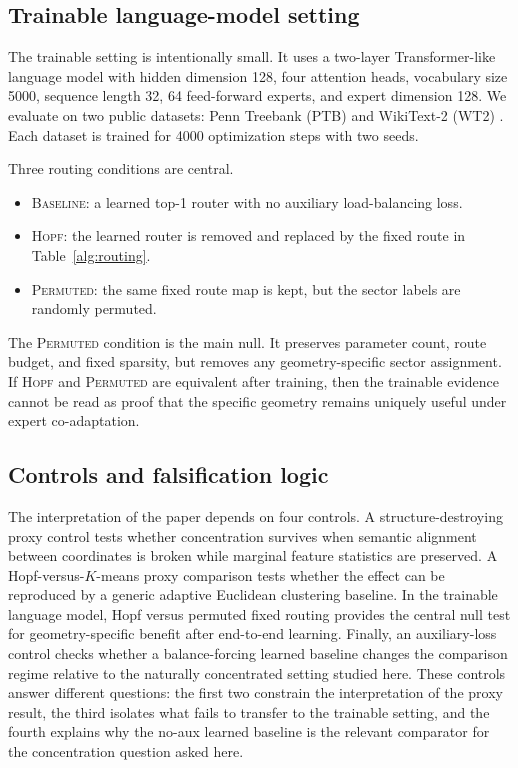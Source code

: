 \documentclass[10pt,letterpaper]{article}
\begin{document}
\subsection{Trainable language-model setting}
The trainable setting is intentionally small. It uses a two-layer Transformer-like language model with hidden dimension 128, four attention heads, vocabulary size 5000, sequence length 32, 64 feed-forward experts, and expert dimension 128. We evaluate on two public datasets: Penn Treebank (PTB) \citep{ptb1993} and WikiText-2 (WT2) \citep{merity2016wt2}. Each dataset is trained for 4000 optimization steps with two seeds.

Three routing conditions are central.
\begin{itemize}
\item \textsc{Baseline}: a learned top-1 router with no auxiliary load-balancing loss.
\item \textsc{Hopf}: the learned router is removed and replaced by the fixed route in Table~\ref{alg:routing}.
\item \textsc{Permuted}: the same fixed route map is kept, but the sector labels are randomly permuted.
\end{itemize}

The \textsc{Permuted} condition is the main null. It preserves parameter count, route budget, and fixed sparsity, but removes any geometry-specific sector assignment. If \textsc{Hopf} and \textsc{Permuted} are equivalent after training, then the trainable evidence cannot be read as proof that the specific geometry remains uniquely useful under expert co-adaptation.

\subsection{Controls and falsification logic}
The interpretation of the paper depends on four controls. A structure-destroying proxy control tests whether concentration survives when semantic alignment between coordinates is broken while marginal feature statistics are preserved. A Hopf-versus-\(K\)-means proxy comparison tests whether the effect can be reproduced by a generic adaptive Euclidean clustering baseline. In the trainable language model, Hopf versus permuted fixed routing provides the central null test for geometry-specific benefit after end-to-end learning. Finally, an auxiliary-loss control checks whether a balance-forcing learned baseline changes the comparison regime relative to the naturally concentrated setting studied here. These controls answer different questions: the first two constrain the interpretation of the proxy result, the third isolates what fails to transfer to the trainable setting, and the fourth explains why the no-aux learned baseline is the relevant comparator for the concentration question asked here.
\end{document}
